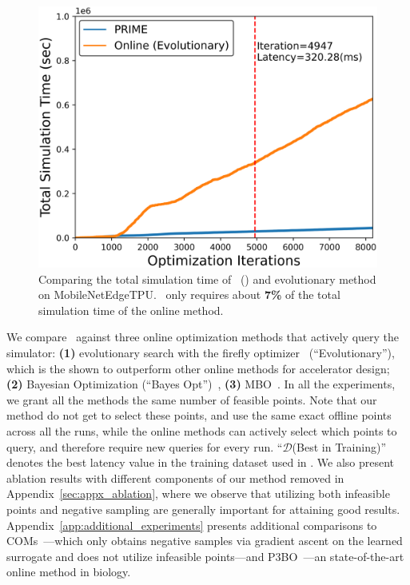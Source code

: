 \begin{figure}
    \centering
    \vspace{-0.45cm}
    \includegraphics[width=0.98\linewidth]{chapters/prime/figs/motivation/simulation_time.png}
    \vspace{-0.3cm}
    \caption{\footnotesize{Comparing the total simulation time of \primemethodname\ () and evolutionary method on MobileNetEdgeTPU. \primemethodname\ only requires about \textbf{7\%} of the total simulation time of the online method.}}
    \vspace{-0.35cm}
    \label{fig:convergence_time}
\end{figure}
%
We compare \primemethodname\ against three online optimization methods that actively query the simulator: \textbf{(1)} evolutionary search with the firefly optimizer~\citep{yazdanbakhsh2021apollo} (``Evolutionary''), which is the shown to outperform other online methods for accelerator design; \textbf{(2)} Bayesian Optimization (``Bayes Opt'')~\citep{vizier:sigkdd:2017},
\textbf{(3)} MBO~\citep{angermueller2019model}. 
%
%
In all the experiments, we grant all the methods the same number of feasible points. Note that our method do not get to select these points, and use the same exact offline points across all the runs, while the online methods can actively select which points to query, and therefore require new queries for every run. 
%
``$\mathcal{D}$(Best in Training)'' denotes the best latency value in the training dataset used in \primemethodname. We also present ablation results with different components of our method removed in Appendix~\ref{sec:appx_ablation}, where we observe that utilizing both infeasible points and negative sampling are generally important for attaining good results. 
%
Appendix~\ref{app:additional_experiments} presents additional comparisons to COMs~\citep{trabucco2021conservative}---which only obtains negative samples via gradient ascent on the learned surrogate and does not utilize infeasible points---and P3BO~\citep{p3bo:arxiv:2020}---an state-of-the-art online method in biology. 

